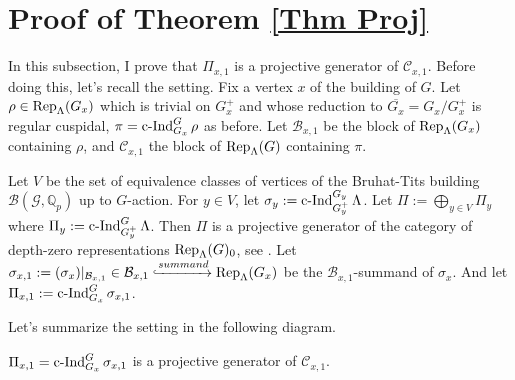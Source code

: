 	
	\section{Proof of Theorem \ref{Thm Proj}}
	
	In this subsection, I prove that $\Pi_{x,1}$ is a projective generator of $\mathcal{C}_{x,1}$. Before doing this, let's recall the setting. Fix a vertex $x$ of the building of $G$. Let $\rho \in \operatorname{\operatorname{Rep}}_{\Lambda}(G_x)$ which is trivial on $G_x^+$ and whose reduction to $\overline{G_x}=G_x/G_x^+$ is regular cuspidal, $\pi=\operatorname{\operatorname{c-Ind}}_{G_x}^G\rho$ as before. Let $\mathcal{B}_{x,1}$ be the block of $\operatorname{\operatorname{Rep}}_{\Lambda}(G_x)$ containing $\rho$, and $\mathcal{C}_{x,1}$ the block of $\operatorname{\operatorname{Rep}}_{\Lambda}(G)$ containing $\pi$. 
	
	Let $V$ be the set of equivalence classes of vertices of the Bruhat-Tits building $\mathcal{B}(\mathcal{G}, \mathbb{Q}_p)$ up to $G$-action. For $y \in V$, let $\sigma_y:=\operatorname{\operatorname{c-Ind}}_{G_y^+}^{G_y}\Lambda$. Let $\Pi:=\bigoplus_{y \in V}\Pi_y$ where $\Pi_y:=\operatorname{\operatorname{c-Ind}}_{G_y^+}^G\Lambda$. Then $\Pi$ is a projective generator of the category of depth-zero representations $\operatorname{\operatorname{Rep}}_{\Lambda}(G)_0$, see \cite[Appendix]{dat2009finitude}. Let $\sigma_{x,1}:=(\sigma_x)|_{\mathcal{B}_{x,1}} \in \mathcal{B}_{x,1} \xhookrightarrow{summand} \operatorname{\operatorname{Rep}}_{\Lambda}(G_x)$ be the $\mathcal{B}_{x,1}$-summand of $\sigma_x$. And let $\Pi_{x,1}:=\operatorname{\operatorname{c-Ind}}_{G_x}^G\sigma_{x,1}$.
	
	Let's summarize the setting in the following diagram.
	
	
	\begin{theorem}
		$\Pi_{x,1}=\operatorname{\operatorname{c-Ind}}_{G_x}^G\sigma_{x,1}$ is a projective generator of $\mathcal{C}_{x,1}$.
	\end{theorem}
	

